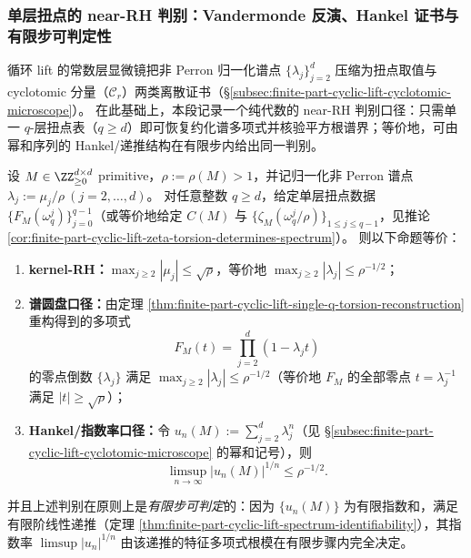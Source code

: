 \subsubsection{单层扭点的 near-RH 判别：Vandermonde 反演、Hankel 证书与有限步可判定性}\label{subsubsec:finite-part-single-layer-torsion-near-rh}
循环 lift 的常数层显微镜把非 Perron 归一化谱点 \(\{\lambda_j\}_{j=2}^d\) 压缩为扭点取值与 cyclotomic 分量（\(\mathcal{C}_r\)）两类离散证书（\S\ref{subsec:finite-part-cyclic-lift-cyclotomic-microscope}）。
在此基础上，本段记录一个纯代数的 near-RH 判别口径：只需单一 \(q\)-层扭点表（\(q\ge d\)）即可恢复约化谱多项式并核验平方根谱界；等价地，可由幂和序列的 Hankel/递推结构在有限步内给出同一判别。

\begin{theorem}[平方根谱界的单层扭点判别]\label{thm:finite-part-single-layer-torsion-near-rh}
设 \(M\in\ZZ_{\ge0}^{d\times d}\) primitive，\(\rho:=\rho(M)>1\)，并记归一化非 Perron 谱点 \(\lambda_j:=\mu_j/\rho\ (j=2,\dots,d)\)。
对任意整数 \(q\ge d\)，给定单层扭点数据 \(\{F_M(\omega_q^j)\}_{j=0}^{q-1}\)（或等价地给定 \(C(M)\) 与 \(\{\zeta_M(\omega_q^j/\rho)\}_{1\le j\le q-1}\)，见推论 \ref{cor:finite-part-cyclic-lift-zeta-torsion-determines-spectrum}）。
则以下命题等价：
\begin{enumerate}
  \item \textbf{kernel-RH：}\(\max_{j\ge2}|\mu_j|\le \sqrt{\rho}\)，等价地 \(\max_{j\ge2}|\lambda_j|\le \rho^{-1/2}\)；
  \item \textbf{谱圆盘口径：}由定理 \ref{thm:finite-part-cyclic-lift-single-q-torsion-reconstruction} 重构得到的多项式
  \[
  F_M(t)=\prod_{j=2}^{d}(1-\lambda_j t)
  \]
  的零点倒数 \(\{\lambda_j\}\) 满足 \(\max_{j\ge2}|\lambda_j|\le \rho^{-1/2}\)（等价地 \(F_M\) 的全部零点 \(t=\lambda_j^{-1}\) 满足 \(|t|\ge \sqrt{\rho}\)）；
  \item \textbf{Hankel/指数率口径：}令 \(u_n(M):=\sum_{j=2}^{d}\lambda_j^{n}\)（见 \S\ref{subsec:finite-part-cyclic-lift-cyclotomic-microscope} 的幂和记号），则
  \[
  \limsup_{n\to\infty}|u_n(M)|^{1/n}\le \rho^{-1/2}.
  \]
\end{enumerate}
并且上述判别在原则上是\emph{有限步可判定}的：因为 \(\{u_n(M)\}\) 为有限指数和，满足有限阶线性递推（定理 \ref{thm:finite-part-cyclic-lift-spectrum-identifiability}），其指数率 \(\limsup |u_n|^{1/n}\) 由该递推的特征多项式根模在有限步骤内完全决定。
\end{theorem}
